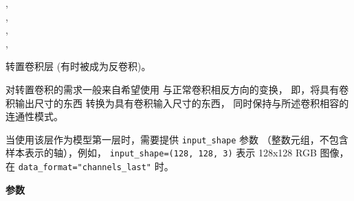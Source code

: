 \begin{Shaded}
\begin{Highlighting}[]
\OperatorTok{=}\NormalTok{(}\NormalTok{, }\OperatorTok{=}, \\
\hspace{3cm}\OperatorTok{=}\OperatorTok{=}\OperatorTok{=}, \\
\hspace{3cm}\OperatorTok{=}\OperatorTok{=}, \\
\hspace{3cm}\OperatorTok{=}\OperatorTok{=}, \\
\hspace{3cm}\OperatorTok{=}\OperatorTok{=}\OperatorTok{=}\NormalTok{)}
\end{Highlighting}
\end{Shaded}

转置卷积层 (有时被成为反卷积)。

对转置卷积的需求一般来自希望使用 与正常卷积相反方向的变换，
即，将具有卷积输出尺寸的东西 转换为具有卷积输入尺寸的东西，
同时保持与所述卷积相容的连通性模式。

当使用该层作为模型第一层时，需要提供 \texttt{input\_shape} 参数
（整数元组，不包含样本表示的轴），例如，
\texttt{input\_shape=(128,\ 128,\ 3)} 表示 128x128 RGB 图像， 在
\texttt{data\_format="channels\_last"} 时。

\textbf{参数}

